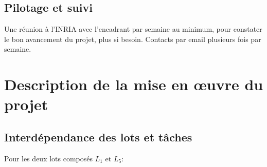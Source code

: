 \documentclass[a4paper]{article}
\begin{document}
\subsection{Pilotage et suivi}
Une réunion à l'INRIA avec l'encadrant par semaine au minimum, pour
constater le bon avancement du projet, plus si besoin. Contacts par
email plusieurs fois par semaine.

\section{Description de la mise en œuvre du projet}
\subsection{Interdépendance des lots et tâches}
Pour les deux lots composés $L_1$ et $L_5$:
\end{document}
